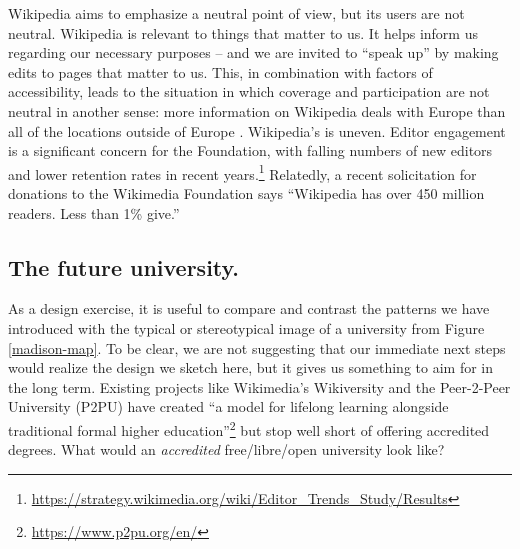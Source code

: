Wikipedia aims to emphasize a neutral point of view, but its users are
not neutral.  Wikipedia is relevant to things that matter to us.  It
helps inform us regarding our necessary purposes -- and we are invited
to ``speak up'' by making edits to pages that matter to us.  This, in
combination with factors of accessibility, leads to the situation in
which coverage and participation are not neutral in another sense:
more information on Wikipedia deals with Europe than all of the
locations outside of Europe \cite{graham2014uneven}.  Wikipedia's
 is uneven.  Editor engagement is a
significant concern for the Foundation, with falling numbers of new
editors and lower retention rates in recent
years.\footnote{\url{https://strategy.wikimedia.org/wiki/Editor_Trends_Study/Results}}
Relatedly, a recent solicitation for donations to the Wikimedia
Foundation says ``Wikipedia has over 450 million readers.  Less than
1\% give.''

\subsection{The future university.}
As a design exercise, it is useful to compare and contrast the
patterns we have introduced with the typical or stereotypical image of
a university from Figure \ref{madison-map}.  To be clear, we are not
suggesting that our immediate next steps would realize the design we
sketch here, but it gives us something to aim for in the long term.
%
Existing projects like Wikimedia's Wikiversity and the Peer-2-Peer
University (P2PU) have created ``a model for lifelong learning
alongside traditional formal higher
education''\footnote{\url{https://www.p2pu.org/en/}} but stop well
short of offering accredited degrees.  What would an \emph{accredited}
free/libre/open university look like?

